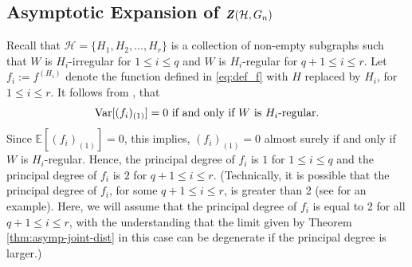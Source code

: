 \documentclass[11pt,reqno]{amsart}
\numberwithin{equation}{section}
\newcommand{\E}{\mathbb{E}}
\newcommand{\cH}{{\mathcal H}}
\theoremstyle{definition}
\def\Var{{\rm Var}}
\begin{document}
\subsection{Asymptotic Expansion of $\textbf{\textit{Z}}(\cH, G_n)$}
\label{sec:expansionasymptoticdistribution}


Recall that $\mathcal H=\{H_1, H_2, \ldots, H_r\}$ is a collection of non-empty subgraphs such that $W$ is $H_i$-irregular for $1 \leq i \leq q$ and $W$ is $H_i$-regular for $q+1 \leq i \leq r$. Let $f_i:=f^{(H_i)}$ denote the function defined in \eqref{eq:def_f} with $H$ replaced by $H_i$, for $1 \leq i \leq r$. It follows from \cite[Lemma 5.4]{BCJ}, that 
$$\Var[(f_i)_{(1)}]=0 \text{ if and only if } W \text{ is } H_i\text{-regular}.$$ 
Since $\E[(f_i)_{(1)}]=0$, this implies, $(f_i)_{(1)}=0$ almost surely if and only if  $W$ is $H_i$-regular. Hence, the principal degree of $f_i$ is $1$ for $1 \leq i \leq q$ and the principal degree of $f_i$ is $2$ for $q+1 \leq i \leq r$. (Technically, it is possible that the principal degree of $f_i$, for some $q+1 \leq i \leq r$, is greater than 2 (see \cite[Section 4.3]{BCJ} for an example). Here, we will assume that the principal degree of $f_i$ is equal to 2 for all $q+1 \leq i \leq r$, with the understanding that the limit given by Theorem \ref{thm:asymp-joint-dist} in this case can be degenerate if the principal degree is larger.)
\end{document}
